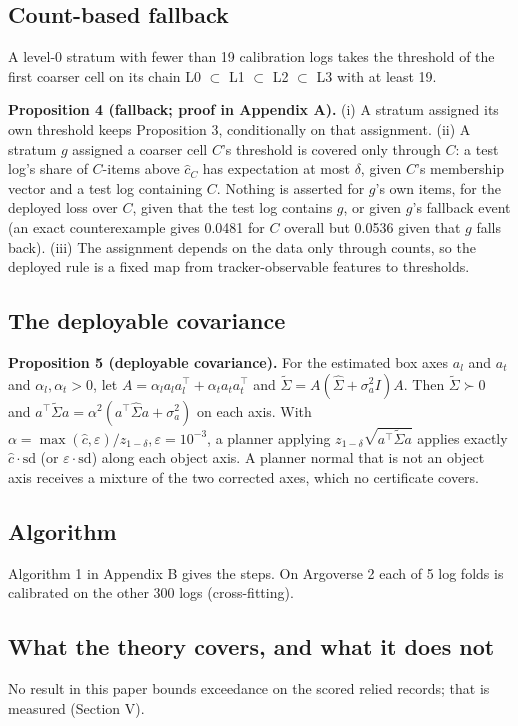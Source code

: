 \documentclass{ieeeaccess}
\begin{document}
\subsection{Count-based fallback}
A level-0 stratum with fewer than 19 calibration logs takes the threshold of the first coarser cell on its chain L0 $\subset$ L1 $\subset$ L2 $\subset$ L3 with at least 19.

\textbf{Proposition 4 (fallback; proof in Appendix A).} (i) A stratum assigned its own threshold keeps Proposition 3, conditionally on that assignment. (ii) A stratum $g$ assigned a coarser cell $C$'s threshold is covered only through $C$: a test log's share of $C$-items above $\hat{c}_{C}$ has expectation at most $\delta$, given $C$'s membership vector and a test log containing $C$. Nothing is asserted for $g$'s own items, for the deployed loss over $C$, given that the test log contains $g$, or given $g$'s fallback event (an exact counterexample gives 0.0481 for $C$ overall but 0.0536 given that $g$ falls back). (iii) The assignment depends on the data only through counts, so the deployed rule is a fixed map from tracker-observable features to thresholds.

\subsection{The deployable covariance}
\textbf{Proposition 5 (deployable covariance).} For the estimated box axes $a_{l}$ and $a_{t}$ and $\alpha_{l}, \alpha_{t} > 0$, let $A = \alpha_{l}a_{l}a_{l}^{\top} + \alpha_{t}a_{t}a_{t}^{\top}$ and $\tilde{\Sigma} = A(\hat{\Sigma} + \sigma_{a}^{2}I)A$. Then $\tilde{\Sigma} \succ 0$ and $a^{\top}\tilde{\Sigma}a = \alpha^{2}(a^{\top}\hat{\Sigma}a + \sigma_{a}^{2})$ on each axis. With $\alpha = \max(\hat{c}, \varepsilon)/z_{1-\delta}, \varepsilon = 10^{-3}$, a planner applying $z_{1-\delta}\sqrt{a^{\top}\tilde{\Sigma}a}$ applies exactly $\hat{c}\cdot\mathrm{sd}$ (or $\varepsilon\cdot\mathrm{sd}$) along each object axis. A planner normal that is not an object axis receives a mixture of the two corrected axes, which no certificate covers.

\subsection{Algorithm}
Algorithm 1 in Appendix B gives the steps. On Argoverse 2 each of 5 log folds is calibrated on the other 300 logs (cross-fitting).

\subsection{What the theory covers, and what it does not}
No result in this paper bounds exceedance on the scored relied records; that is measured (Section V).
\end{document}
